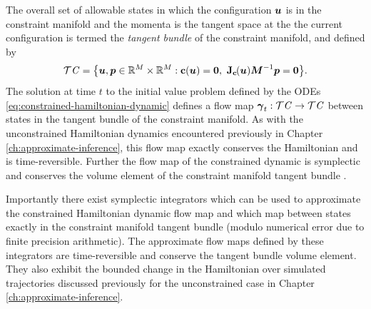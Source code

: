 The overall set of allowable states in which the configuration $\boldsymbol{u}$ is in the constraint manifold and the momenta is the tangent space at the the current configuration is termed the \emph{tangent bundle} of the constraint manifold, and defined by
\begin{equation}\label{eq:constraint-tanget-bundle}
  \sset{T}\set{C} = \lbr 
    \vct{u},\vct{p} \in \reals^M \times \reals^M :
    \vctfunc{c}(\vct{u}) = \vct{0},~
    \jacob{\vctfunc{c}}{\vct{u}}\mtx{M}^{-1}\vct{p} = \vct{0} 
  \rbr.
\end{equation}
The solution at time $t$ to the initial value problem defined by the \acp{ODE} \eqref{eq:constrained-hamiltonian-dynamic} defines a flow map $\boldsymbol{\gamma}_t : \mathcal{T}\mathit{C} \to \mathcal{T}\mathit{C}$ between states in the tangent bundle of the constraint manifold. As with the unconstrained Hamiltonian dynamics encountered previously in Chapter \ref{ch:approximate-inference}, this flow map exactly conserves the Hamiltonian and is time-reversible. Further the flow map of the constrained dynamic is symplectic and  conserves the volume element of the constraint manifold tangent bundle \citep{leimkuhler2004simulating}.

Importantly there exist symplectic integrators which can be used to approximate the constrained Hamiltonian dynamic flow map and which map between states exactly in the constraint manifold tangent bundle (modulo numerical error due to finite precision arithmetic). The approximate flow maps defined by these integrators are time-reversible and conserve the tangent bundle volume element. They also exhibit the bounded change in the Hamiltonian over simulated trajectories discussed previously for the unconstrained case in Chapter \ref{ch:approximate-inference}.

